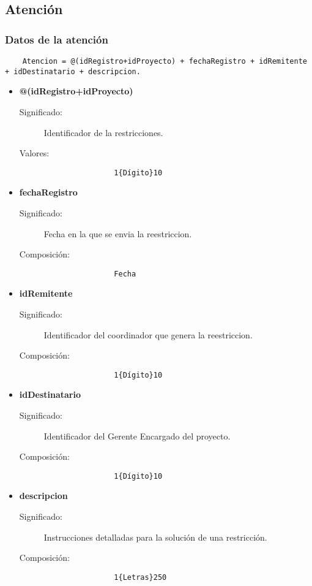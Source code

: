 \subsection{Atención}\label{dd:Atencion}
\subsubsection{Datos de la atención}
\begin{lstlisting}
	Atencion = @(idRegistro+idProyecto) + fechaRegistro + idRemitente + idDestinatario + descripcion.
\end{lstlisting}
\begin{itemize}
	\item	\textbf{@(idRegistro+idProyecto)}
		\begin{description}
			\item [Significado:] Identificador de la restricciones.
			\item [Valores:]{\begin{lstlisting}
				1{Dígito}10\end{lstlisting}}
		\end{description}
	\item \textbf{fechaRegistro}
		\begin{description}
			\item [Significado:] Fecha en la que se envia la reestriccion.
			\item [Composición:]{\begin{lstlisting}
				Fecha\end{lstlisting}}
		\end{description}
	\item \textbf{idRemitente}
		\begin{description}
			\item [Significado:] Identificador del coordinador que genera la reestriccion.
			\item [Composición:]{\begin{lstlisting}
				1{Dígito}10\end{lstlisting}}
		\end{description}
	\item \textbf{idDestinatario}
		\begin{description}
			\item [Significado:] Identificador del Gerente Encargado del proyecto.
			\item [Composición:]{\begin{lstlisting}
				1{Dígito}10\end{lstlisting}}
		\end{description}
	\item \textbf{descripcion}
		\begin{description}
			\item [Significado:] Instrucciones detalladas para la solución de una restricción.
			\item [Composición:]{\begin{lstlisting}
				1{Letras}250\end{lstlisting}}
		\end{description}
\end{itemize}


